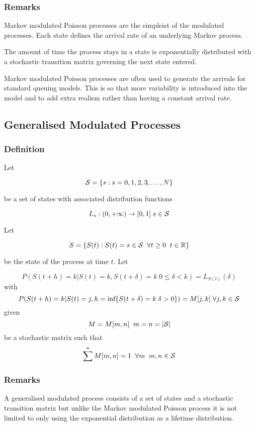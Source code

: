 \subsubsection{Remarks}

Markov modulated Poisson processes are the simpleist of the modulated
processes.  Each state defines the arrival rate of an underlying
Markov process.

The amount of time the process stays in a state is exponentially
distributed with a stochastic transition matrix governing the next
state entered.

Markov modulated Poisson processes are often used to generate the
arrivals for standard queuing models.  This is so that more
variability is introduced into the model and to add extra realism
rather than having a constant arrival rate.

\subsection{Generalised Modulated Processes}

\subsubsection{Definition}

Let

\[ {\cal S} = \{s : s = 0,1,2,3,\ldots, N \} \]

be a set of states with associated distribution functions

\[ L_s : (0, +\infty) \rightarrow [0,1] \; s \in {\cal S} \]

Let

\[
S = \{ S(t) : S(t) = s \in {\cal S} \; \; \forall t \geq 0 \; \; t \in {\Bbb R} \}
\]

be the state of the process at time $t$.  Let

\[
P(S(t+h) = k | S(t) = k, S(t + \delta) = k \; 0 \leq \delta < k) =
L_{S(t)}(\delta)
\]
with
\[
P(S(t+h) = k | S(t) = j, h = \mbox{inf}\{S(t + \delta) = k \; \delta >
0\}) = M[j,k] \; \forall j,k \in {\cal S}
\]
given
\[
M = M[m,n] \; \; m = n = |{\cal S}|
\]
be a stochastic matrix such that
\[
\sum^n M[m,n] = 1 \; \; \forall m \; \; m,n \in {\cal S}
\]


\subsubsection{Remarks}

A generalised modulated process consists of a set of states and a
stochastic transition matrix but unlike the Markov modulated Poisson
process it is not limited to only using the exponential distribution
as a lifetime distribution.

